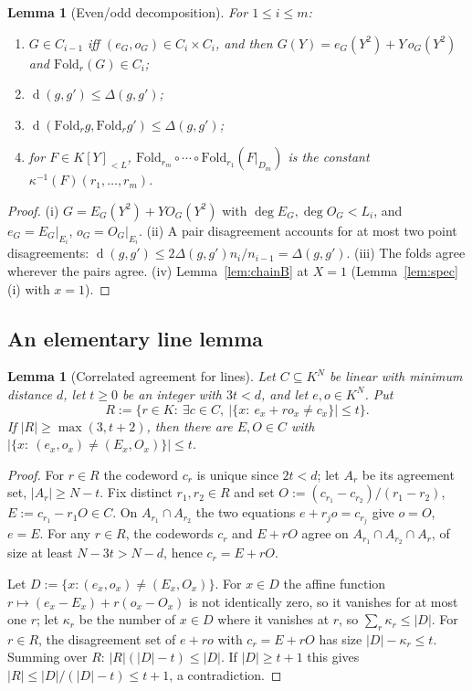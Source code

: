 \documentclass[11pt]{article}
\newtheorem{lemma}[theorem]{Lemma}
\theoremstyle{definition}
\newcommand{\K}{K}
\newcommand{\Fold}{\mathrm{Fold}}
\DeclareMathOperator{\dist}{d}
\begin{document}
\begin{lemma}[Even/odd decomposition]\label{lem:pair}
For $1\le i\le m$:
\begin{enumerate}[label=(\roman*)]
\item $G\in C_{i-1}$ iff $(e_G,o_G)\in C_i\times C_i$, and then $G(Y)=e_G(Y^2)+Y\,o_G(Y^2)$ and $\Fold_r(G)\in C_i$;
\item $\dist(g,g')\le\Delta(g,g')$;
\item $\dist(\Fold_r g,\Fold_r g')\le\Delta(g,g')$;
\item for $F\in\K[Y]_{<L}$, $\Fold_{r_m}\circ\cdots\circ\Fold_{r_1}(F|_{D_m})$ is the constant $\kappa^{-1}(F)(r_1,\dots,r_m)$.
\end{enumerate}
\end{lemma}
\begin{proof}
(i) $G=E_G(Y^2)+YO_G(Y^2)$ with $\deg E_G,\deg O_G<L_i$, and $e_G=E_G|_{E_i}$, $o_G=O_G|_{E_i}$. (ii) A pair disagreement accounts for at most two point disagreements: $\dist(g,g')\le2\Delta(g,g')n_i/n_{i-1}=\Delta(g,g')$. (iii) The folds agree wherever the pairs agree. (iv) Lemma~\ref{lem:chainB} at $X=1$ (Lemma~\ref{lem:spec}(i) with $x=1$).
\end{proof}

\subsection{An elementary line lemma}

\begin{lemma}[Correlated agreement for lines]\label{lem:line}
Let $C\subseteq\K^N$ be linear with minimum distance $d$, let $t\ge0$ be an integer with $3t<d$, and let $e,o\in\K^N$. Put
\[
R:=\{r\in\K:\ \exists c\in C,\ |\{x:\ e_x+ro_x\ne c_x\}|\le t\}.
\]
If $|R|\ge\max(3,t+2)$, then there are $E,O\in C$ with $|\{x:\ (e_x,o_x)\ne(E_x,O_x)\}|\le t$.
\end{lemma}
\begin{proof}
For $r\in R$ the codeword $c_r$ is unique since $2t<d$; let $A_r$ be its agreement set, $|A_r|\ge N-t$. Fix distinct $r_1,r_2\in R$ and set $O:=(c_{r_1}-c_{r_2})/(r_1-r_2)$, $E:=c_{r_1}-r_1O\in C$. On $A_{r_1}\cap A_{r_2}$ the two equations $e+r_jo=c_{r_j}$ give $o=O$, $e=E$. For any $r\in R$, the codewords $c_r$ and $E+rO$ agree on $A_{r_1}\cap A_{r_2}\cap A_r$, of size at least $N-3t>N-d$, hence $c_r=E+rO$.

Let $D:=\{x:(e_x,o_x)\ne(E_x,O_x)\}$. For $x\in D$ the affine function $r\mapsto(e_x-E_x)+r(o_x-O_x)$ is not identically zero, so it vanishes for at most one $r$; let $\kappa_r$ be the number of $x\in D$ where it vanishes at $r$, so $\sum_{r}\kappa_r\le|D|$. For $r\in R$, the disagreement set of $e+ro$ with $c_r=E+rO$ has size $|D|-\kappa_r\le t$. Summing over $R$: $|R|(|D|-t)\le|D|$. If $|D|\ge t+1$ this gives $|R|\le|D|/(|D|-t)\le t+1$, a contradiction.
\end{proof}
\end{document}
